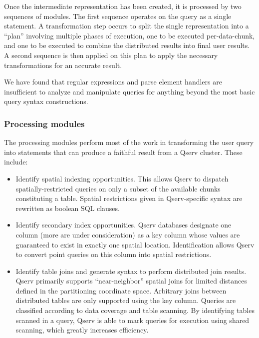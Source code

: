 \documentclass[DM,lsstdraft,toc]{lsstdoc}
\begin{document}
Once the intermediate representation has been created, it is processed by two
sequences of modules. The first sequence operates on the query as a single
statement. A transformation step occurs to split the single representation
into a ``plan'' involving multiple phases of execution, one to be executed
per-data-chunk, and one to be executed to combine the distributed results
into final user results. A second sequence is then applied on this plan to
apply the necessary transformations for an accurate result.

We have found that regular expressions and parse element handlers are
insufficient to analyze and manipulate queries for anything beyond the
most basic query syntax constructions.

\subsubsection{Processing modules}\label{processing-modules}

The processing modules perform most of the work in transforming the user
query into statements that can produce a faithful result from a Qserv
cluster. These include:

\begin{itemize}
\item
  Identify spatial indexing opportunities. This allows Qserv to dispatch
  spatially-restricted queries on only a subset of the available chunks
  constituting a table. Spatial restrictions given in Qserv-specific
  syntax are rewritten as boolean SQL clauses.
\item
  Identify secondary index opportunities. Qserv databases designate one
  column (more are under consideration) as a key column whose values
  are guaranteed to exist in exactly one spatial location. Identification
  allows Qserv to convert point queries on this column into spatial
  restrictions.
\item
  Identify table joins and generate syntax to perform distributed join
  results. Qserv primarily supports ``near-neighbor'' spatial joins for
  limited distances defined in the partitioning coordinate space.
  Arbitrary joins between distributed tables are only supported using
  the key column. Queries are classified according to data coverage and table
  scanning. By identifying tables scanned in a query, Qserv is able to
  mark queries for execution using shared scanning, which greatly
  increases efficiency.
\end{itemize}
\end{document}
